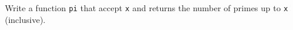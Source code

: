   Write a function \verb!pi! that accept \verb!x! and returns
  the number of primes up to \verb!x! (inclusive).
